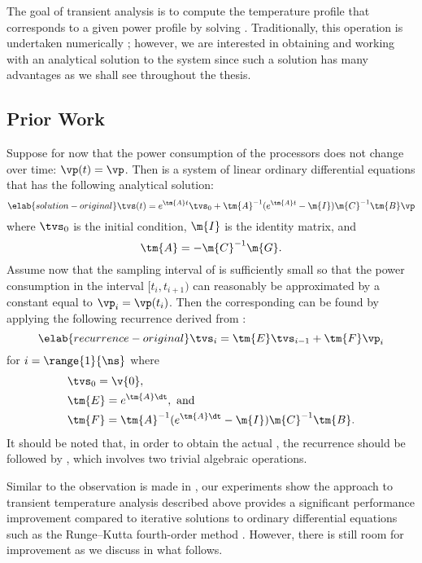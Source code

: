 The goal of transient analysis is to compute the temperature profile \mq that
corresponds to a given power profile \mp by solving
. Traditionally, this operation is undertaken
numerically \cite{skadron2003}; however, we are interested in obtaining and
working with an analytical solution to the system since such a solution has many
advantages as we shall see throughout the thesis.

\subsection{Prior Work}

Suppose for now that the power consumption of the processors does not change
over time: $\vp(t) = \vp$. Then  is a
system of linear ordinary differential equations that has the following
analytical solution:
\begin{equation} \elab{solution-original}
  \tvs(t) = e^{\tm{A} t} \tvs_0 + \tm{A}^{-1} (e^{\tm{A} t} - \m{I}) \m{C}^{-1} \tm{B} \vp
\end{equation}
where $\tvs_0$ is the initial condition, $\m{I}$ is the identity matrix, and
\[
  \tm{A} = -\m{C}^{-1} \m{G}.
\]
Assume now that the sampling interval \dt of \mp is sufficiently small so that
the power consumption in the interval $[t_i, t_{i + 1})$ can reasonably be
approximated by a constant equal to $\vp_i = \vp(t_i)$. Then the corresponding
\mq can be found by applying the following recurrence derived from
:
\begin{equation} \elab{recurrence-original}
  \tvs_{i} = \tm{E} \tvs_{i - 1} + \tm{F} \vp_i
\end{equation}
for $i = \range{1}{\ns}$ where
\begin{align*}
  & \tvs_0 = \v{0}, \\
  & \tm{E} = e^{\tm{A} \dt}, \text{ and} \\
  & \tm{F} = \tm{A}^{-1}(e^{\tm{A} \dt} - \m{I})\m{C}^{-1} \tm{B}.
\end{align*}
It should be noted that, in order to obtain the actual \mq, the recurrence
should be followed by , which involves two
trivial algebraic operations.

Similar to the observation is made in \cite{thiele2011}, our experiments show
the approach to transient temperature analysis described above provides a
significant performance improvement compared to iterative solutions to ordinary
differential equations such as the Runge--Kutta fourth-order method
\cite{press2007}. However, there is still room for improvement as we discuss in
what follows.

